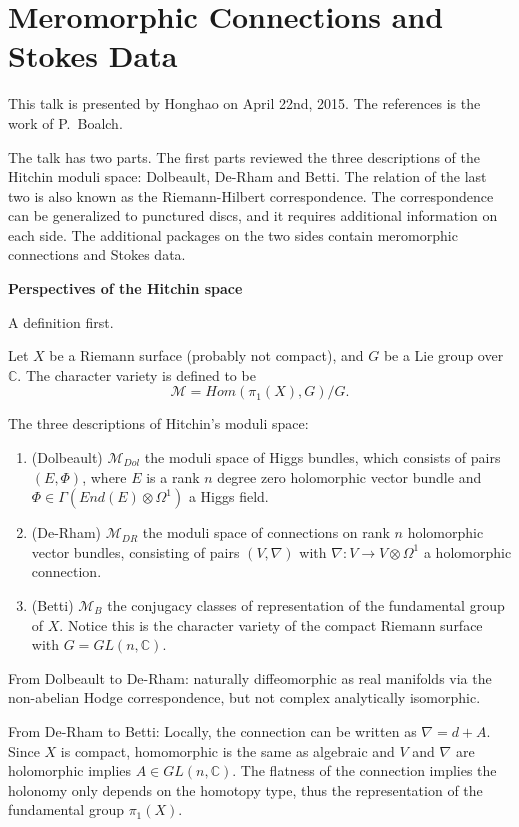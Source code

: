 \chapter{Meromorphic Connections and Stokes Data}
This talk is presented by Honghao on  April 22nd, 2015. The references is the work of P.~Boalch.

The talk has two parts. The first parts reviewed the three descriptions of the Hitchin moduli space: Dolbeault, De-Rham and Betti. The relation of the last two is also known as the Riemann-Hilbert correspondence. The correspondence can be generalized to punctured discs, and it requires additional information on each side. The additional packages on the two sides contain meromorphic connections and Stokes data.

\medskip
\textbf{Perspectives of the Hitchin space}

A definition first.

Let $X$ be a Riemann surface (probably not compact), and $G$ be a Lie group over $\mathbb{C}$. The character variety is defined to be
$$\mathcal {M} = Hom (\pi_1(X),G)/G.$$

The three descriptions of Hitchin's moduli space:
\begin{enumerate}
  \item (Dolbeault) $\mathcal{M}_{Dol}$ the moduli space of Higgs bundles, which consists of pairs $(E,\Phi)$, where $E$ is a rank $n$ degree zero holomorphic vector bundle and $\Phi\in \Gamma(End(E)\otimes \Omega^1)$ a Higgs field.
  \item (De-Rham) $\mathcal{M}_{DR}$ the moduli space of connections on rank $n$ holomorphic vector bundles, consisting of pairs $(V, \nabla)$ with $\nabla: V\rightarrow V \otimes \Omega^1$ a holomorphic connection.
  \item (Betti) $\mathcal{M}_{B}$ the conjugacy classes of representation of the fundamental group of $X$. Notice this is the character variety of the compact Riemann surface with $G=GL(n,\mathbb{C})$.
\end{enumerate}

From Dolbeault to De-Rham: naturally diffeomorphic as real manifolds via the non-abelian Hodge correspondence, but not complex analytically isomorphic.

From De-Rham to Betti: Locally, the connection can be written as $\nabla = d + A$. Since $X$ is compact, homomorphic is the same as algebraic and $V$ and $\nabla$ are holomorphic implies $A\in GL(n,\mathbb{C})$. The flatness of the connection implies the holonomy only depends on the homotopy type, thus the representation of the fundamental group $\pi_1(X)$.

